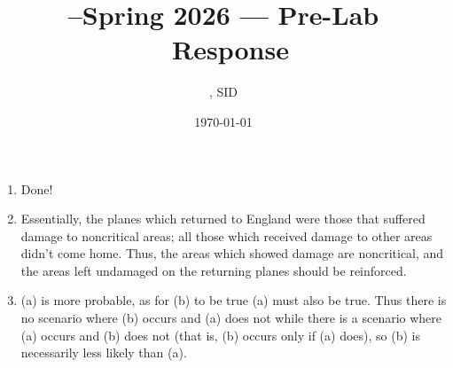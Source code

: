 \documentclass[11pt]{article}
\title{\Cls--Spring 2026 --- Pre-Lab \PreLab \ Response}
\author{\Name, SID \SID}
\date{\today}
\begin{document}
\maketitle

\begin{enumerate}
    \item Done!
    \item Essentially, the planes which returned to England were those that suffered
          damage to noncritical areas; all those which received damage to other areas
          didn't come home. Thus, the areas which showed damage are noncritical, and
          the areas left undamaged on the returning planes should be reinforced.
    \item (a) is more probable, as for (b) to be true (a) must also be true. Thus
          there is no scenario where (b) occurs and (a) does not while there is a scenario
          where (a) occurs and (b) does not (that is, (b) occurs only if (a) does), so (b)
          is necessarily less likely than (a).
\end{enumerate}
\end{document}
